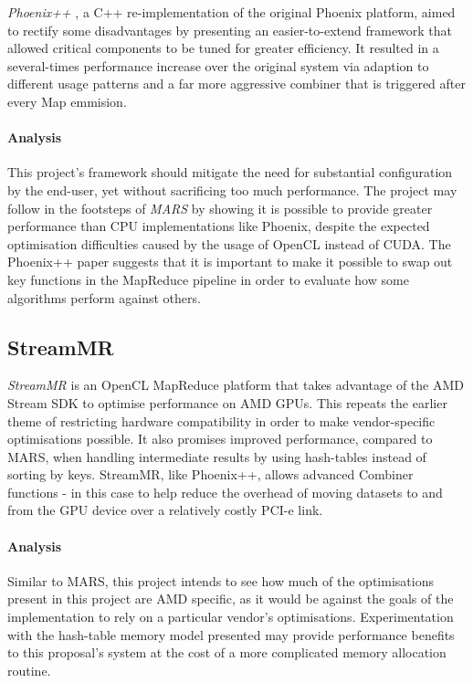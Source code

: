\emph{Phoenix++} \cite{phoenix++}, a C++ re-implementation of the original Phoenix platform, aimed to rectify some disadvantages by presenting an easier-to-extend framework that allowed critical components to be tuned for greater efficiency. It resulted in a several-times performance increase over the original system via adaption to different usage patterns and a far more aggressive combiner that is triggered after every Map emmision.

\paragraph{Analysis}
This project's framework should mitigate the need for substantial configuration by the end-user, yet without sacrificing too much performance. The project may follow in the footsteps of \emph{MARS} by showing it is possible to provide greater performance than CPU implementations like Phoenix, despite the expected optimisation difficulties caused by the usage of OpenCL instead of CUDA.
The Phoenix++ paper suggests that it is important to make it possible to swap out key functions in the MapReduce pipeline in order to evaluate how some algorithms perform against others.

\subsection{StreamMR}
\emph{StreamMR} \cite{streammr} is an OpenCL MapReduce platform that takes advantage of the AMD Stream SDK to optimise performance on AMD \ac{GPUs}. This repeats the earlier theme of restricting hardware compatibility in order to make vendor-specific optimisations possible. It also promises improved performance, compared to MARS, when handling intermediate results by using hash-tables instead of sorting by keys. StreamMR, like Phoenix++, allows advanced Combiner functions - in this case to help reduce the overhead of moving datasets to and from the GPU device over a relatively costly PCI-e link.

\paragraph{Analysis}
Similar to MARS, this project intends to see how much of the optimisations present in this project are AMD specific, as it would be against the goals of the implementation to rely on a particular vendor's optimisations. Experimentation with the hash-table memory model presented may provide performance benefits to this proposal's system at the cost of a more complicated memory allocation routine.
